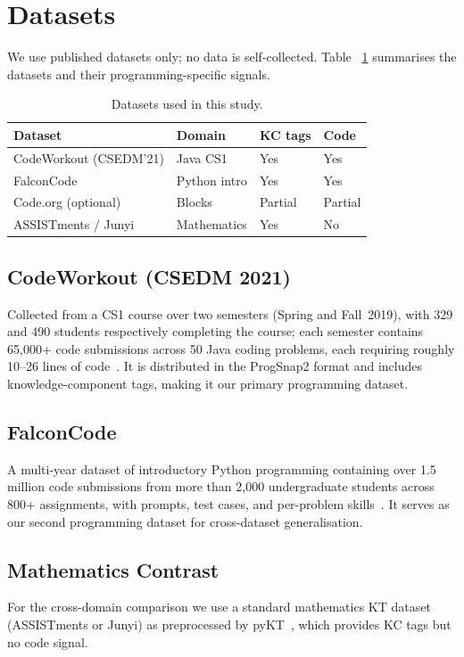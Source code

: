 \section{Datasets}
\label{sec:datasets}

We use published datasets only; no data is self-collected. Table~%
\ref{tab:datasets} summarises the datasets and their programming-specific
signals.

\begin{table}[t]
\caption{Datasets used in this study.}
\label{tab:datasets}
\centering
\small
\begin{tabular}{@{}llll@{}}
\toprule
\textbf{Dataset} & \textbf{Domain} & \textbf{KC tags} & \textbf{Code} \\
\midrule
CodeWorkout (CSEDM'21) & Java CS1     & Yes & Yes \\
FalconCode            & Python intro & Yes & Yes \\
Code.org (optional)   & Blocks       & Partial & Partial \\
ASSISTments / Junyi   & Mathematics  & Yes & No  \\
\bottomrule
\end{tabular}
\end{table}

\subsection{CodeWorkout (CSEDM 2021)}
Collected from a CS1 course over two semesters (Spring and Fall~2019),
with 329 and 490 students respectively completing the course; each
semester contains 65{,}000+ code submissions across 50 Java coding
problems, each requiring roughly 10--26 lines of
code~\cite{csedm2021}. It is distributed in the ProgSnap2 format and
includes knowledge-component tags, making it our primary programming
dataset.

\subsection{FalconCode}
A multi-year dataset of introductory Python programming containing over
1.5 million code submissions from more than 2{,}000 undergraduate
students across 800+ assignments, with prompts, test cases, and
per-problem skills~\cite{falconcode2023}. It serves as our second
programming dataset for cross-dataset generalisation.

\subsection{Mathematics Contrast}
For the cross-domain comparison we use a standard mathematics KT dataset
(ASSISTments or Junyi) as preprocessed by pyKT~\cite{liu2022pykt}, which
provides KC tags but no code signal.

